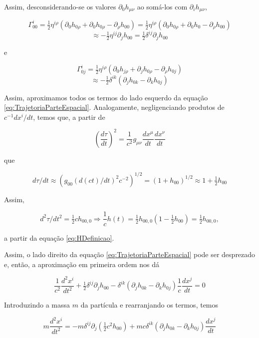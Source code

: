 Assim, desconsiderando-se os valores $ \partial_{0} h_{\mu \nu} $ ao somá-los com $ \partial_{i} h_{\mu \nu} $,

\[
\Gamma_{00}^{i}=\tfrac{1}{2} \eta^{i \rho}\left(\partial_{0} h_{0 \rho}+\partial_{0} h_{0 \rho}-\partial_{\rho} h_{00}\right) = 
\tfrac{1}{2} \eta^{i \rho}\left(\partial_{0} h_{0 \rho}+\partial_{0} h_{0 }-\partial_{\rho} h_{00}\right)
\]
\[
\approx -\tfrac{1}{2} \eta^{i j} \partial_{j} h_{00}=\tfrac{1}{2} \delta^{i j} \partial_{j} h_{00}
\]

e

\[
\Gamma_{0 j}^{i}=\tfrac{1}{2} \eta^{i \rho}\left(\partial_{0} h_{j \rho}+\partial_{j} h_{0 \rho}-\partial_{\rho} h_{0 j}\right)
\]
\[
\approx -\tfrac{1}{2} \delta^{i k}\left(\partial_{j} h_{0 k}-\partial_{k} h_{0 j}\right)
\]

Assim, aproximamos todos os termos do lado esquerdo da equação \ref{eq:TrajetoriaParteEspacial}. Analogamente, negligenciando produtos de $ c^{-1} d x^{i} / d t $, temos que, a partir de

\[
\left(\frac{d \tau}{d t}\right)^{2}=\frac{1}{c^{2}} g_{\mu \nu} \frac{d x^{\mu}}{d t} \frac{d x^{\nu}}{d t}
\]

que

\[
d \tau / d t\approx \left(g_{00}\left({d(ct)}/dt\right)^2c^{-2}\right)^{1/2} = \left(1+h_{00}\right)^{1 / 2}\approx 1+\tfrac{1}{2} h_{00}
\]

Assim,

\[
d^{2} \tau / d t^{2}=\tfrac{1}{2} c h_{00,0} \Rightarrow \frac{1}{c} h(t)=\tfrac{1}{2} h_{00,0}\left(1-\tfrac{1}{2} h_{00}\right)=\tfrac{1}{2} h_{00,0},
\]

a partir da equação \ref{eq:HDefinicao}. 

Assim, o lado direito da equação \ref{eq:TrajetoriaParteEspacial} pode ser desprezado e, então, a aproximação em primeira ordem nos dá

\[
\frac{1}{c^{2}} \frac{d^{2} x^{i}}{d t^{2}}+\tfrac{1}{2} \delta^{i j} \partial_{j} h_{00}-\delta^{i k}\left(\partial_{j} h_{0 k}-\partial_{k} h_{0 j}\right) \frac{1}{c} \frac{d x^{j}}{d t}=0
\]

Introduzindo a massa $ m $ da partícula e rearranjando os termos, temos

\begin{equation}\label{eq:TrajetoriaParticulaComMassa}
m \frac{d^{2} x^{i}}{d t^{2}}=-m \delta^{i j} \partial_{j}\left(\tfrac{1}{2} c^{2} h_{00}\right)+m c \delta^{i k}\left(\partial_{j} h_{0 k}-\partial_{k} h_{0 j}\right) \frac{d x^{j}}{d t}
\end{equation}

